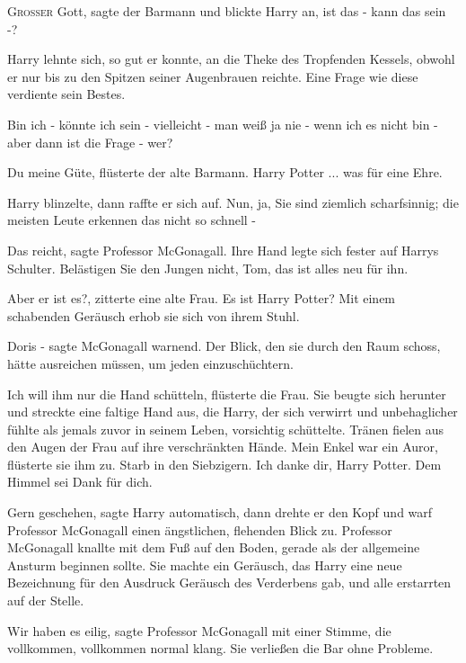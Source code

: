
\lettrine{\loq G}{roßer} Gott\grqq{}, sagte der Barmann und blickte Harry an,
\glqq{}ist das - kann das sein -?\grqq{}

Harry lehnte sich, so gut er konnte, an die Theke des Tropfenden Kessels, obwohl
er nur bis zu den Spitzen seiner Augenbrauen reichte. Eine Frage wie diese
verdiente sein Bestes.

\glqq{}Bin ich - könnte ich sein - vielleicht - man weiß ja nie - wenn ich es
nicht bin - aber dann ist die Frage - wer?\grqq{}

\glqq{}Du meine Güte\grqq{}, flüsterte der alte Barmann. \glqq{}Harry Potter ...
was für eine Ehre.\grqq{}

Harry blinzelte, dann raffte er sich auf. \glqq{}Nun, ja, Sie sind ziemlich
scharfsinnig; die meisten Leute erkennen das nicht so schnell -\grqq{}

\glqq{}Das reicht\grqq{}, sagte Professor McGonagall. Ihre Hand legte sich fester
auf Harrys Schulter. \glqq{}Belästigen Sie den Jungen nicht, Tom, das ist alles
neu für ihn.\grqq{}

\glqq{}Aber er ist es?\grqq{}, zitterte eine alte Frau. \glqq{}Es ist Harry
Potter?\grqq{} Mit einem schabenden Geräusch erhob sie sich von ihrem Stuhl.

\glqq{}Doris -\grqq{} sagte McGonagall warnend. Der Blick, den sie durch den Raum
schoss, hätte ausreichen müssen, um jeden einzuschüchtern.

\glqq{}Ich will ihm nur die Hand schütteln\grqq{}, flüsterte die Frau. Sie beugte
sich herunter und streckte eine faltige Hand aus, die Harry, der sich verwirrt
und unbehaglicher fühlte als jemals zuvor in seinem Leben, vorsichtig
schüttelte. Tränen fielen aus den Augen der Frau auf ihre verschränkten Hände.
\glqq{}Mein Enkel war ein Auror\grqq{}, flüsterte sie ihm zu. \glqq{}Starb in den
Siebzigern. Ich danke dir, Harry Potter. Dem Himmel sei Dank für dich.\grqq{}

\glqq{}Gern geschehen\grqq{}, sagte Harry automatisch, dann drehte er den Kopf
und warf Professor McGonagall einen ängstlichen, flehenden Blick zu. Professor
McGonagall knallte mit dem Fuß auf den Boden, gerade als der allgemeine Ansturm
beginnen sollte. Sie machte ein Geräusch, das Harry eine neue Bezeichnung für
den Ausdruck \glqq{}Geräusch des Verderbens\grqq{} gab, und alle erstarrten auf
der Stelle.

\glqq{}Wir haben es eilig\grqq{}, sagte Professor McGonagall mit einer Stimme,
die vollkommen, vollkommen normal klang. Sie verließen die Bar ohne Probleme.

